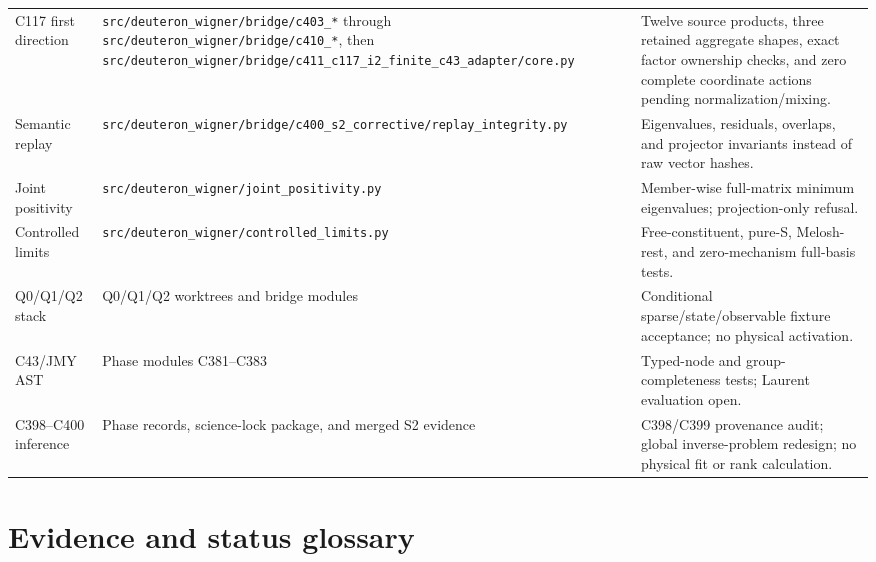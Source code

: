 \documentclass[11pt,oneside]{book}
\newcommand{\codepath}[1]{\nolinkurl{#1}}
\begin{document}
\begin{longtable}{p{}p{}p{}}
C117 first direction&\codepath{src/deuteron_wigner/bridge/c403_*} through \codepath{src/deuteron_wigner/bridge/c410_*}, then \codepath{src/deuteron_wigner/bridge/c411_c117_i2_finite_c43_adapter/core.py}&Twelve source products, three retained aggregate shapes, exact factor ownership checks, and zero complete coordinate actions pending normalization/mixing.\\
Semantic replay&\codepath{src/deuteron_wigner/bridge/c400_s2_corrective/replay_integrity.py}&Eigenvalues, residuals, overlaps, and projector invariants instead of raw vector hashes.\\
Joint positivity&\codepath{src/deuteron_wigner/joint_positivity.py}&Member-wise full-matrix minimum eigenvalues; projection-only refusal.\\
Controlled limits&\codepath{src/deuteron_wigner/controlled_limits.py}&Free-constituent, pure-S, Melosh-rest, and zero-mechanism full-basis tests.\\
Q0/Q1/Q2 stack&Q0/Q1/Q2 worktrees and bridge modules&Conditional sparse/state/observable fixture acceptance; no physical activation.\\
C43/JMY AST&Phase modules C381--C383&Typed-node and group-completeness tests; Laurent evaluation open.\\
C398--C400 inference&Phase records, science-lock package, and merged S2 evidence&C398/C399 provenance audit; global inverse-problem redesign; no physical fit or rank calculation.\\
\bottomrule
\end{longtable}

\chapter{Evidence and status glossary}
\label{app:status-glossary}
\end{document}
